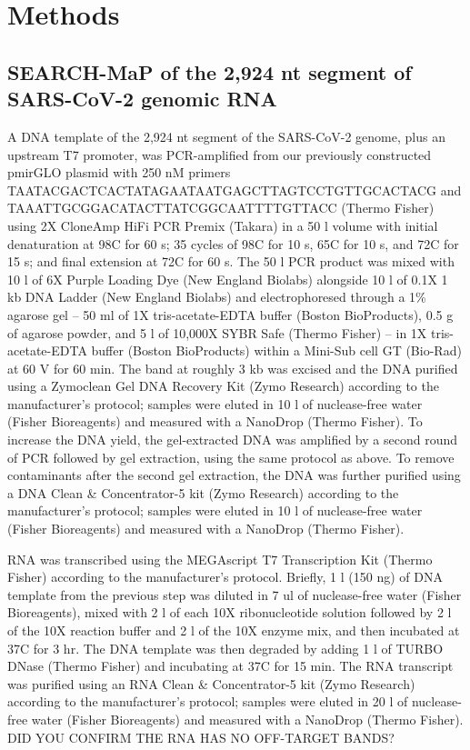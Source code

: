 \documentclass[main.tex]{subfiles}
\begin{document}
\section{Methods}
\label{methods}


\subsection{SEARCH-MaP of the 2,924 nt segment of SARS-CoV-2 genomic RNA}

A DNA template of the 2,924 nt segment of the SARS-CoV-2 genome, plus an upstream T7 promoter, was PCR-amplified from our previously constructed pmirGLO plasmid \cite{Lan2022} with 250 nM primers TAATACGACTCACTATAGAATAATGAGCTTAGTCCTGTTGCACTACG and TAAATTGCGGACATACTTATCGGCAATTTTGTTACC (Thermo Fisher) using 2X CloneAmp HiFi PCR Premix (Takara) in a 50 \textmu l volume with initial denaturation at 98\textdegree C for 60 s; 35 cycles of 98\textdegree C for 10 s, 65\textdegree C for 10 s, and 72\textdegree C for 15 s; and final extension at 72\textdegree C for 60 s.
The 50 \textmu l PCR product was mixed with 10 \textmu l of 6X Purple Loading Dye (New England Biolabs) alongside 10 \textmu l of 0.1X 1 kb DNA Ladder (New England Biolabs) and electrophoresed through a 1\% agarose gel -- 50 ml of 1X tris-acetate-EDTA buffer (Boston BioProducts), 0.5 g of agarose powder, and 5 \textmu l of 10,000X SYBR Safe (Thermo Fisher) -- in 1X tris-acetate-EDTA buffer (Boston BioProducts) within a Mini-Sub cell GT (Bio-Rad) at 60 V for 60 min.
The band at roughly 3 kb was excised and the DNA purified using a Zymoclean Gel DNA Recovery Kit (Zymo Research) according to the manufacturer's protocol; samples were eluted in 10 \textmu l of nuclease-free water (Fisher Bioreagents) and measured with a NanoDrop (Thermo Fisher).
To increase the DNA yield, the gel-extracted DNA was amplified by a second round of PCR followed by gel extraction, using the same protocol as above.
To remove contaminants after the second gel extraction, the DNA was further purified using a DNA Clean \& Concentrator-5 kit (Zymo Research) according to the manufacturer's protocol; samples were eluted in 10 \textmu l of nuclease-free water (Fisher Bioreagents) and measured with a NanoDrop (Thermo Fisher).

RNA was transcribed using the MEGAscript T7 Transcription Kit (Thermo Fisher) according to the manufacturer's protocol.
Briefly, 1 \textmu l (150 ng) of DNA template from the previous step was diluted in 7 ul of nuclease-free water (Fisher Bioreagents), mixed with 2 \textmu l of each 10X ribonucleotide solution followed by 2 \textmu l of the 10X reaction buffer and 2 \textmu l of the 10X enzyme mix, and then incubated at 37\textdegree C for 3 hr.
The DNA template was then degraded by adding 1 \textmu l of TURBO DNase (Thermo Fisher) and incubating at 37\textdegree C for 15 min.
The RNA transcript was purified using an RNA Clean \& Concentrator-5 kit (Zymo Research) according to the manufacturer's protocol; samples were eluted in 20 \textmu l of nuclease-free water (Fisher Bioreagents) and measured with a NanoDrop (Thermo Fisher).
DID YOU CONFIRM THE RNA HAS NO OFF-TARGET BANDS?
\end{document}

